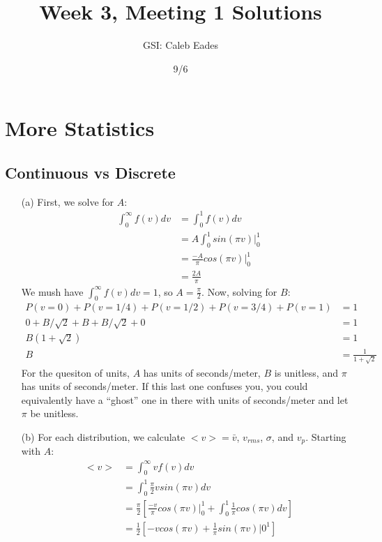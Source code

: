 \documentclass{article}
\begin{document}
	
\title{Week 3, Meeting 1 Solutions}
\author{GSI: Caleb Eades}
\date{9/6}
\maketitle

\section{More Statistics}

\subsection{Continuous vs Discrete}

\begin{itemize}
	\item[(a)] First, we solve for $A$:
	\begin{align*}
	\int_0^{\infty} f(v)dv &= \int_0^1 f(v)dv \\
	&= A\int_0^1 sin(\pi v)|_0^1 \\
	&= \frac{-A}{\pi}cos(\pi v)|_0^1 \\
	&= \frac{2A}{\pi}
	\end{align*}
	We mush have $\int_0^{\infty} f(v)dv = 1$, so $A = \frac{\pi}{2}$. Now, solving for $B$:
	\begin{align*}
	P(v=0) + P(v=1/4) + P(v=1/2) + P(v=3/4) + P(v=1) &= 1 \\
	0 + B/\sqrt{2} + B + B/\sqrt{2} + 0 &= 1 \\
	B(1 + \sqrt{2}) &= 1 \\
	B &= \frac{1}{1+\sqrt{2}}
	\end{align*}
	For the quesiton of units, $A$ has units of seconds/meter, $B$ is unitless, and $\pi$ has units of seconds/meter. If this last one confuses you, you could equivalently have a ``ghost'' one in there with units of seconds/meter and let $\pi$ be unitless.
	\item[(b)] For each distribution, we calculate $<v> = \bar{v}$, $v_{rms}$, $\sigma$, and $v_p$. Starting with $A$:
	\begin{align*}
	<v> &= \int_0^{\infty} vf(v)dv \\
	&= \int_0^1 \frac{\pi}{2}vsin(\pi v)dv \\
	&= \frac{\pi}{2}\left[\frac{-v}{\pi}cos(\pi v)|_0^1 + \int_0^1\frac{1}{\pi}cos(\pi v)dv\right] \\
	&= \frac{1}{2}\left[-vcos(\pi v) + \frac{1}{\pi} sin(\pi v)|0^1\right] \\

\end{align*}
\end{itemize}
\end{document}
